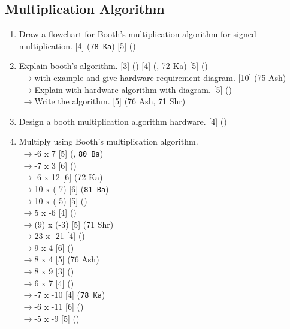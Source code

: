 \documentclass[12pt]{article}
\newcommand{\lb}{\\$\left|\rightarrow\right.$}
\begin{document}
	\subsection{Multiplication Algorithm}
		\begin{enumerate}[noitemsep, topsep=0pt]
			\item Draw a flowchart for Booth's multiplication algorithm for signed multiplication. \hfill [4] (\texttt{78 Ka}) [5] ()
			
			\item Explain booth's algorithm. \hfill [3] () [4] (, 72 Ka) [5] ()
			\lb with example and give hardware requirement diagram. \hfill [10] (75 Ash)
			\lb Explain with hardware algorithm with diagram. \hfill [5] ()
			\lb Write the algorithm. \hfill [5] (76 Ash, 71 Shr)
			
			\item Design a booth multiplication algorithm hardware. \hfill [4] ()
			
			\item Multiply using Booth's multiplication algorithm.
				\lb -6 x 7 \hfill [5] (, \texttt{80 Ba})
				\lb -7 x 3 \hfill [6] ()
				\lb -6 x 12 \hfill [6] (72 Ka)
				\lb 10 x (-7) \hfill [6] (\texttt{81 Ba})
				\lb 10 x (-5) \hfill [5] ()
				\lb 5 x -6 \hfill [4] ()
				\lb (9) x (-3) \hfill [5] (71 Shr)
				\lb 23 x -21 \hfill [4] ()
				\lb 9 x 4 \hfill [6] ()
				\lb 8 x 4 \hfill [5] (76 Ash)
				\lb 8 x 9 \hfill [3] ()
				\lb 6 x 7 \hfill [4] ()
				\lb -7 x -10 \hfill [4] (\texttt{78 Ka})
				\lb -6 x -11 \hfill [6] ()
				\lb -5 x -9 \hfill [5] ()
		\end{enumerate}
\end{document}
